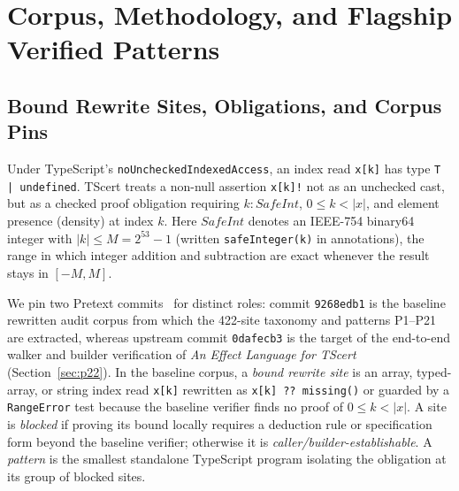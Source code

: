 \documentclass[10pt,a4paper]{article}
\newcommand{\len}[1]{|#1|}
\newcommand{\code}[1]{\textcolor{codec}{\texttt{#1}}}
\begin{document}
\section{Corpus, Methodology, and Flagship Verified Patterns}\label{sec:corpus}

\subsection{Bound Rewrite Sites, Obligations, and Corpus Pins}

Under TypeScript's \code{noUncheckedIndexedAccess}, an index read
\code{x[k]} has type \code{T | undefined}. TScert treats a non-null
assertion \code{x[k]!} not as an unchecked cast, but as a checked proof
obligation requiring $k:\mathit{SafeInt}$, $0\le k<\len{x}$, and element
presence (density) at index $k$. Here $\mathit{SafeInt}$ denotes an
IEEE-754 binary64 integer with $|k|\le M=2^{53}-1$ (written
\code{safeInteger(k)} in annotations), the range in which integer
addition and subtraction are exact whenever the result stays in
$[-M,M]$.

We pin two Pretext commits~\cite{pretext} for distinct roles: commit
\code{9268edb1} is the baseline rewritten audit corpus from which the
422-site taxonomy and patterns P1--P21 are extracted, whereas upstream
commit \code{0dafecb3} is the target of the end-to-end walker and
builder verification of \emph{An Effect Language for TScert}~\cite{el}
(Section~\ref{sec:p22}). In the baseline corpus, a \emph{bound rewrite
site} is an array, typed-array, or string index read \code{x[k]}
rewritten as \code{x[k] ?? missing()} or guarded by a \code{RangeError}
test because the baseline verifier finds no proof of $0\le k<\len{x}$.
A site is \emph{blocked} if proving its bound locally requires a
deduction rule or specification form beyond the baseline verifier;
otherwise it is \emph{caller/builder-establishable}. A \emph{pattern} is
the smallest standalone TypeScript program isolating the obligation at
its group of blocked sites.
\end{document}
